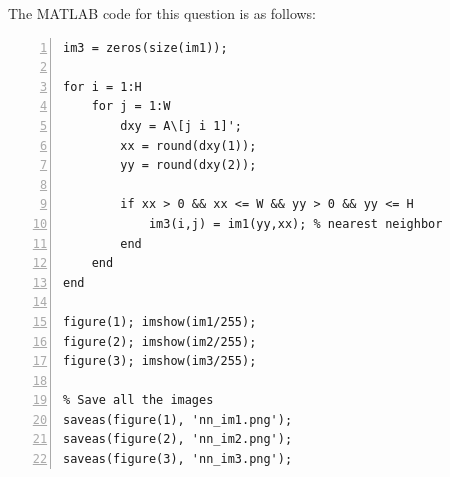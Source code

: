 \documentclass{article}
\begin{document}
The MATLAB code for this question is as follows:
\begin{lstlisting}[frame=single,numbers=left,style=Matlab-Pyglike,breaklines=true,postbreak=\mbox{\textcolor{red}{$\hookrightarrow$}\space}]
im3 = zeros(size(im1));

for i = 1:H 
    for j = 1:W 
        dxy = A\[j i 1]'; 
        xx = round(dxy(1)); 
        yy = round(dxy(2)); 
        
        if xx > 0 && xx <= W && yy > 0 && yy <= H 
            im3(i,j) = im1(yy,xx); % nearest neighbor
        end
    end
end

figure(1); imshow(im1/255);
figure(2); imshow(im2/255);
figure(3); imshow(im3/255);

% Save all the images
saveas(figure(1), 'nn_im1.png');
saveas(figure(2), 'nn_im2.png');
saveas(figure(3), 'nn_im3.png');
\end{lstlisting}
\end{document}
